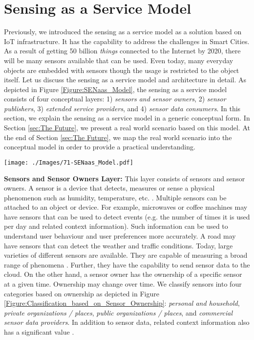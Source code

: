 \documentclass[times]{ettauth}
\begin{document}
\section{Sensing as a Service Model}
\label{sec:Sensing_as_a_Service Model}


Previously, we introduced the sensing as a service model as a solution  based on IoT infrastructure. It has the capability to address the challenges in Smart Cities. As a result of getting 50 billion \textit{things} connected to the Internet by 2020, there will be many sensors available that can be used. Even today, many everyday objects are embedded with sensors though the usage is restricted to the object itself. Let us discuss the sensing as a service model and architecture in detail. As depicted in Figure \ref{Figure:SENaas_Model}, the sensing as a service model consists of four conceptual layers: 1) \textit{sensors and sensor owners}, 2) \textit{sensor publishers}, 3) \textit{extended service providers}, and 4) \textit{sensor data consumers}. In this section, we explain the sensing as a service model in a generic conceptual form. In Section \ref{sec:The Future}, we present a real world scenario based on this model. At the end of Section \ref{sec:The Future}, we map the real world scenario into the conceptual model in order to provide a practical understanding.



\begin{figure*}[b]
 \centering
\texttt{[image: ./Images/71-SENaas\_Model.pdf]}
\caption{The sensing as a service model}
 \label{Figure:SENaas_Model}	
\end{figure*}


\textbf{Sensors and Sensor Owners Layer:} This layer consists of sensors and sensor owners. A sensor is a device that detects, measures or sense a physical phenomenon such as humidity, temperature, etc. \cite{P009}. Multiple sensors can be attached to an object or device. For example, microwaves or coffee machines may have sensors that can be used to detect events (e.g. the number of times it is used per day and related context information). Such information can be used to understand user behaviour and user preferences more accurately. A road may have sensors that can detect the weather and traffic conditions. Today, large varieties of different sensors are available. They are capable of measuring a broad range of phenomena \cite{P595}. Further, they have the capability to send  sensor data to the cloud. On the other hand, a sensor owner has the ownership of a specific sensor at a given time. Ownership may change over time. We classify sensors into four categories based on ownership as depicted in Figure \ref{Figure:Classification_based_on_Sensor_Ownership}: \textit{personal and household}, \textit{private organizations / places}, \textit{public organizations / places}, and \textit{commercial sensor data providers}. In  addition to sensor data, related context information also has a significant value \cite{ZMP007}.
\end{document}
